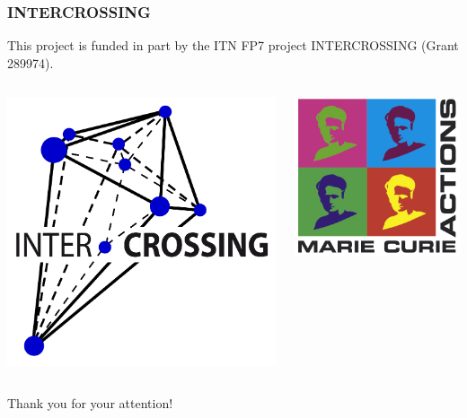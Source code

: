 \documentclass{beamer}
\begin{document}
\begin{frame}
\frametitle{INTERCROSSING}
This project is funded in part by the ITN FP7 project INTERCROSSING (Grant 289974).

\begin{columns}[T]
		\begin{column}{.5\textwidth}
			\hspace{.25\textwidth}\includegraphics[width=.5\textwidth]{intercrossing.png}
		\end{column}
		\begin{column}{.5\textwidth}
			\hspace{.25\textwidth}\includegraphics[width=.5\textwidth]{mc.jpg}
		\end{column}
	\end{columns}
\end{frame}


\begin{frame}
\Huge{\centerline{Thank you for your attention!}}
\end{frame}
\end{document}
